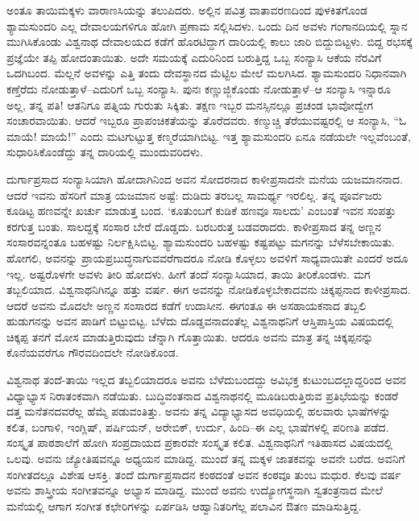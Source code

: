 ಅಂತೂ ತಾಯಿಮಕ್ಕಳು ವಾರಾಣಸಿಯನ್ನು ತಲುಪಿದರು. ಅಲ್ಲಿನ ಪವಿತ್ರ ವಾತಾವರಣದಿಂದ ಪುಳಕಿತಗೊಂಡ ಶ್ಯಾಮಸುಂದರಿ ಎಲ್ಲ ದೇವಾಲಯಗಳಿಗೂ ಹೋಗಿ ಪ್ರಣಾಮ ಸಲ್ಲಿಸಿದಳು. ಒಂದು ದಿನ ಅವಳು ಗಂಗಾನದಿಯಲ್ಲಿ ಸ್ನಾನ ಮುಗಿಸಿಕೊಂಡು ವಿಶ್ವನಾಥ ದೇವಾಲಯದ ಕಡೆಗೆ ಹೊರಟಿದ್ದಾಗ ದಾರಿಯಲ್ಲಿ ಕಾಲು ಜಾರಿ ಬಿದ್ದುಬಿಟ್ಟಳು. ಬಿದ್ದ ರಭಸಕ್ಕೆ ಪ್ರಜ್ಞೆಯೇ ತಪ್ಪಿ ಹೋದಂತಾಯಿತು. ಅದೇ ಸಮಯಕ್ಕೆ ಎದುರಿನಿಂದ ಬರುತ್ತಿದ್ದ ಒಬ್ಬ ಸಂನ್ಯಾಸಿ ಆಕೆಯ ನೆರವಿಗೆ ಒದಗಿಬಂದ. ಮೆಲ್ಲನೆ ಅವಳನ್ನು ಎತ್ತಿ ತಂದು ದೇವಸ್ಥಾನದ ಮೆಟ್ಟಿಲ ಮೇಲೆ ಮಲಗಿಸಿದ. ಶ್ಯಾಮಸುಂದರಿ ನಿಧಾನವಾಗಿ ಕಣ್ತೆರೆದು ನೋಡುತ್ತಾಳೆ–ಎದುರಿಗೆ ಒಬ್ಬ ಸಂನ್ಯಾಸಿ. ಪುನಃ ಕಣ್ಣುಜ್ಜಿಕೊಂಡು ನೋಡುತ್ತಾಳೆ–ಆ ಸಂನ್ಯಾಸಿ ಇನ್ನಾರೂ ಅಲ್ಲ, ತನ್ನ ಪತಿ! ಆತನಿಗೂ ಪತ್ನಿಯ ಗುರುತು ಸಿಕ್ಕಿತು. ತಕ್ಷಣ ಇಬ್ಬರ ಮನಸ್ಸಿನಲ್ಲೂ ಪ್ರಚಂಡ ಭಾವೋದ್ವೇಗ ಸಂಚಾರವಾಯಿತು. ಆದರೆ ಇಬ್ಬರೂ ಪ್ರಾಪಂಚಿಕತೆಯನ್ನು ತೊರೆದವರು. ಕಣ್ಮುಚ್ಚಿ ತೆರೆಯುವಷ್ಟರಲ್ಲಿ ಆ ಸಂನ್ಯಾಸಿ, “ಓ ಮಾಯೆ! ಮಾಯೆ!” ಎಂದು ಮಟಗುಟ್ಟುತ್ತ ಕಣ್ಮರೆಯಾಗಿಬಿಟ್ಟ. ಇತ್ತ ಶ್ಯಾಮಸುಂದರಿ ಏನೂ ನಡೆಯಲೇ ಇಲ್ಲವೆಂಬಂತೆ, ಸುಧಾರಿಸಿಕೊಂಡೆದ್ದು ತನ್ನ ದಾರಿಯಲ್ಲಿ ಮುಂದುವರಿದಳು.

ದುರ್ಗಾಪ್ರಸಾದ ಸಂನ್ಯಾಸಿಯಾಗಿ ಹೋದಾಗಿನಿಂದ ಅವನ ಸೋದರನಾದ ಕಾಳೀಪ್ರಸಾದನೇ ಮನೆಯ ಯಜಮಾನನಾದ. ಆದರೆ ಇವನು ಹೆಸರಿಗೆ ಮಾತ್ರ ಯಜಮಾನ ಅಷ್ಟೆ: ದುಡಿದು ತರಬಲ್ಲ ಸಾಮರ್ಥ್ಯ ಇರಲಿಲ್ಲ. ತನ್ನ ಪೂರ್ವಜರು ಕೂಡಿಟ್ಟ ಹಣವನ್ನೇ ಖರ್ಚು ಮಾಡುತ್ತ ಬಂದ. ‘ಕೂತುಂಬಗೆ ಕುಡಿಕೆ ಹಣವೂ ಸಾಲದು’ ಎಂಬಂತೆ ಇವನ ಸಂಪತ್ತು ಕರಗುತ್ತ ಬಂತು. ಸಾಲದ್ದಕ್ಕೆ ಸಂಸಾರ ಬೇರೆ ದೊಡ್ಡದು. ಬರಬರುತ್ತ ಬಡವರಾದರು. ಕಾಳೀಪ್ರಸಾದ ತನ್ನ ಅಣ್ಣನ ಸಂಸಾರವನ್ನಂತೂ ಬಹಳಷ್ಟು ನಿರ್ಲಕ್ಷಿಸಿಬಿಟ್ಟ. ಶ್ಯಾಮಸುಂದರಿ ಬಹಳಷ್ಟು ಕಷ್ಟಪಟ್ಟು ಮಗನನ್ನು ಬೆಳೆಸಬೇಕಾಯಿತು. ಹೋಗಲಿ, ಅವನನ್ನು ಪ್ರಾಯಪ್ರಬುದ್ಧನಾಗುವವರೆಗಾದರೂ ನೋಡಿ ಕೊಳ್ಳಲು ಅವಳಿಗೆ ಸಾಧ್ಯವಾಯಿತೇ ಎಂದರೆ ಅದೂ ಇಲ್ಲ. ಅಷ್ಟರೊಳಗೇ ಅವಳು ತೀರಿ ಹೋದಳು. ಹೀಗೆ ತಂದೆ ಸಂನ್ಯಾಸಿಯಾದ, ತಾಯಿ ತೀರಿಕೊಂಡಳು. ಮಗ ತಬ್ಬಲಿಯಾದ. ವಿಶ್ವನಾಥನಿಗಿನ್ನೂ ಹತ್ತು ವರ್ಷ. ಈಗ ಅವನನ್ನು ನೋಡಿಕೊಳ್ಳಬೇಕಾದವನು ಚಿಕ್ಕಪ್ಪನಾದ ಕಾಳೀಪ್ರಸಾದ. ಆದರೆ ಅವನು ಮೊದಲೇ ಅಣ್ಣನ ಸಂಸಾರದ ಕಡೆಗೆ ಉದಾಸೀನ. ಈಗಂತೂ ಈ ಅಸಹಾಯಕನಾದ ತಬ್ಬಲಿ ಹುಡುಗನನ್ನು ಅವನ ಪಾಡಿಗೆ ಬಿಟ್ಟುಬಿಟ್ಟ. ಬೆಳೆದು ದೊಡ್ಡವನಾದಂತೆಲ್ಲ ವಿಶ್ವನಾಥನಿಗೆ ಆಸ್ತಿಪಾಸ್ತಿಯ ವಿಷಯದಲ್ಲಿ ಚಿಕ್ಕಪ್ಪ ತನಗೆ ಮೋಸ ಮಾಡುತ್ತಿರುವುದು ಚೆನ್ನಾಗಿ ಗೊತ್ತಾಯಿತು. ಆದರೂ ಅವನು ಮಾತ್ರ ತನ್ನ ಚಿಕ್ಕಪ್ಪನನ್ನು ಕೊನೆಯವರೆಗೂ ಗೌರವದಿಂದಲೇ ನೋಡಿಕೊಂಡ.

ವಿಶ್ವನಾಥ ತಂದೆ-ತಾಯಿ ಇಲ್ಲದ ತಬ್ಬಲಿಯಾದರೂ ಅವನು ಬೆಳೆದುಬಂದದ್ದು ಅವಿಭಕ್ತ ಕುಟುಂಬದಲ್ಲಾದ್ದರಿಂದ ಅವನ ವಿಧ್ಯಾಭ್ಯಾಸ ನಿರಾತಂಕವಾಗಿ ನಡೆಯಿತು. ಬುದ್ಧಿವಂತನಾದ ವಿಶ್ವನಾಥನಲ್ಲಿ ಮೂಡಿಬರುತ್ತಿರುವ ಪ್ರತಿಭೆಯನ್ನು ಕಂಡರೆ ದತ್ತ ಮನೆತನದವರೆಲ್ಲ ಹೆಮ್ಮೆ ಪಡುವಂತಿತ್ತು. ಅವನು ತನ್ನ ವಿದ್ಯಾಭ್ಯಾಸದ ಅವಧಿಯಲ್ಲಿ ಹಲವಾರು ಭಾಷೆಗಳನ್ನು ಕಲಿತ, ಬಂಗಾಳಿ, ಇಂಗ್ಲಿಷ್, ಪರ್ಷಿಯನ್, ಅರೇಬಿಕ್, ಉರ್ದು, ಹಿಂದಿ–ಈ ಎಲ್ಲ ಭಾಷೆಗಳಲ್ಲಿ ಪರಿಣತಿ ಪಡೆದ. ಸಂಸ್ಕೃತ ಪಾಠಶಾಲೆಗೆ ಹೋಗಿ ಸಂಪ್ರದಾಯದ ಪ್ರಕಾರವೇ ಸಂಸ್ಕೃತ ಕಲಿತ. ವಿಶ್ವನಾಥನಿಗೆ ಇತಿಹಾಸದ ವಿಷಯದಲ್ಲಿ ಒಲವು. ಅವನು ಜ್ಯೋತಿಷವನ್ನೂ ಅಧ್ಯಯನ ಮಾಡಿದ್ದ. ಮುಂದೆ ತನ್ನ ಮಕ್ಕಳ ಜಾತಕವನ್ನು ಅವನೇ ಬರೆದ. ಅವನಿಗೆ ಸಂಗೀತದಲ್ಲೂ ವಿಶೇಷ ಆಸಕ್ತಿ. ತಂದೆ ದುರ್ಗಾಪ್ರಸಾದನ ಕಂಠದಂತೆ ಅವನ ಕಂಠವೂ ತುಂಬ ಮಧುರ. ಕೆಲವು ವರ್ಷ ಅವನು ಶಾಸ್ತ್ರೀಯ ಸಂಗೀತವನ್ನೂ ಅಭ್ಯಾಸ ಮಾಡಿದ್ದ. ಮುಂದೆ ಅವನು ಉದ್ಯೋಗಸ್ಥನಾಗಿ ಸ್ವತಂತ್ರನಾದ ಮೇಲೆ ಮನೆಯಲ್ಲಿ ಆಗಾಗ ಸಂಗೀತ ಕಛೇರಿಗಳನ್ನು ಏರ್ಪಡಿಸಿ ಆಹ್ವಾನಿತರಿಗೆಲ್ಲ ಪಲಾವಿನ ಔತಣ ಮಾಡಿಸುತ್ತಿದ್ದ.

